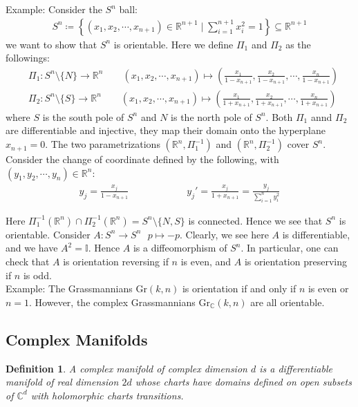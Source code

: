 \documentclass[11pt]{book}
\theoremstyle{break}
\theoremstyle{break}
\newtheorem{defn}{Definition}[corL]
\newcommand{\R}{\mathbb{R}}
\newcommand{\C}{\mathbb{C}}
\newcommand{\example}{\color{green}Example: \color{black}}
\begin{document}
\example Consider the $S^n$ ball:
\begin{align*}
S^n \coloneqq \left\{ (x_1,x_2,\cdots, x_{n+1}) \in \R^{n+1}\mid \sum_{i=1}^{n+1}x_i^2  = 1\right\} \subseteq \R^{n+1}
\end{align*}
we want to show that $S^n$ is orientable. Here we define $\Pi_1$ and $\Pi_2$ as the followings:
\begin{align*}
&\Pi_1 : S^n \setminus \{N\} \to \R^n \qquad (x_1,x_2,\cdots,x_{n+1}) \mapsto \left( \frac{x_1}{1-x_{n+1}} , \frac{x_2}{1-x_{n+1}},\cdots, \frac{x_n}{1-x_{n+1}}\right)\\
&\Pi_2 : S^n \setminus \{S\} \to \R^n \qquad (x_1,x_2,\cdots,x_{n+1}) \mapsto \left( \frac{x_1}{1+x_{n+1}} , \frac{x_2}{1+x_{n+1}},\cdots, \frac{x_n}{1+x_{n+1}}\right)
\end{align*}
where $S$ is the south pole of $S^n$ and $N$ is the north pole of $S^n$. Both $\Pi_1$ annd $\Pi_2$ are differentiable and injective, they map their domain onto the hyperplane $x_{n+1} = 0$. The two parametrizations $(\R^n, \Pi^{-1}_1)$ and $(\R^n, \Pi_2^{-1})$  cover $S^n$. Consider the change of coordinate defined by the following, with $(y_1,y_2,\cdots, y_n) \in \R^n$:
\begin{align*}
y_j = \frac{x_j}{1-x_{n+1}}\qquad\qquad\qquad y_j' = \frac{x_j}{1+x_{n+1}} = \frac{y_j}{\sum_{i=1}^n y_i^2}
\end{align*}

Here $\Pi_{1}^{-1}(\R^n) \cap \Pi_2^{-1}(\R^n)  = S^n \setminus \{N, S\}$ is connected. Hence we see that $S^n$ is orientable. Consider $A:S^n \to S^n\ \ \ p\mapsto-p$. Clearly, we see here $A$ is differentiable, and we have $A^2=\mathbb{I}$. Hence $A$ is a diffeomorphism of $S^n$. In particular, one can check that $A$ is orientation reversing if $n$ is even, and $A$ is orientation preserving if $n$ is odd.\\

\example The Grassmannians $\text{Gr}(k,n)$ is orientation if and only if $n$ is even or $n = 1$. However, the complex Grassmannians $\text{Gr}_{\C}(k,n)$ are all orientable.\\

\subsection{Complex Manifolds}
\begin{defn}
A complex manifold of complex dimension $d$ is a differentiable manifold of real dimension $2d$ whose charts have domains defined on open subsets of $\C^d$ with holomorphic charts transitions.  
\end{defn}
\end{document}

